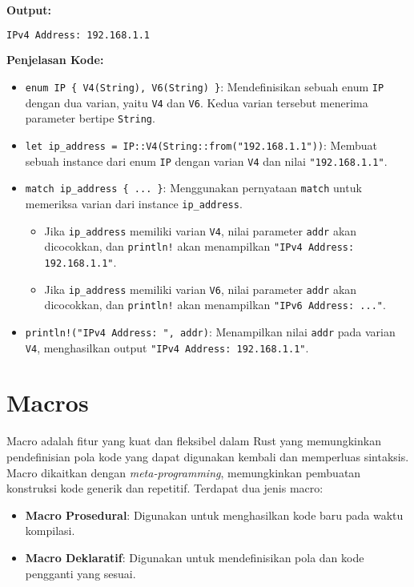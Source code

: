 \textbf{Output:}
\begin{lstlisting}[language=bash, caption={Output Program Enum}]
	IPv4 Address: 192.168.1.1
\end{lstlisting}

\textbf{Penjelasan Kode:}
\begin{itemize}
	\item \texttt{enum IP \{ V4(String), V6(String) \}}: Mendefinisikan sebuah enum \texttt{IP} dengan dua varian, yaitu \texttt{V4} dan \texttt{V6}. Kedua varian tersebut menerima parameter bertipe \texttt{String}.
	\item \texttt{let ip\_address = IP::V4(String::from("192.168.1.1"))}: Membuat sebuah instance dari enum \texttt{IP} dengan varian \texttt{V4} dan nilai \texttt{"192.168.1.1"}.
	\item \texttt{match ip\_address \{ ... \}}: Menggunakan pernyataan \texttt{match} untuk memeriksa varian dari instance \texttt{ip\_address}.
	\begin{itemize}
		\item Jika \texttt{ip\_address} memiliki varian \texttt{V4}, nilai parameter \texttt{addr} akan dicocokkan, dan \texttt{println!} akan menampilkan \texttt{"IPv4 Address: 192.168.1.1"}.
		\item Jika \texttt{ip\_address} memiliki varian \texttt{V6}, nilai parameter \texttt{addr} akan dicocokkan, dan \texttt{println!} akan menampilkan \texttt{"IPv6 Address: ..."}.
	\end{itemize}
	\item \texttt{println!("IPv4 Address: {}", addr)}: Menampilkan nilai \texttt{addr} pada varian \texttt{V4}, menghasilkan output \texttt{"IPv4 Address: 192.168.1.1"}.
\end{itemize}

\section{Macros}

Macro adalah fitur yang kuat dan fleksibel dalam Rust yang memungkinkan pendefinisian pola kode yang dapat digunakan kembali dan memperluas sintaksis. Macro dikaitkan dengan \textit{meta-programming}, memungkinkan pembuatan konstruksi kode generik dan repetitif. Terdapat dua jenis macro:
\begin{itemize}
	\item \textbf{Macro Prosedural}: Digunakan untuk menghasilkan kode baru pada waktu kompilasi.
	\item \textbf{Macro Deklaratif}: Digunakan untuk mendefinisikan pola dan kode pengganti yang sesuai.
\end{itemize}

